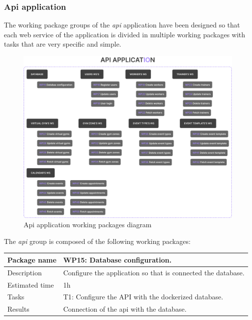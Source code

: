 \documentclass[a4paper, 12pt, oneside]{book}
\begin{document}
\subsubsection{Api application}
\label{working-packages-api}
The working package groups of the \emph{api} application have been designed so that each web service of the application is divided in multiple working packages with tasks that are very specific and simple.
\begin{figure}[H]
	\centering
	\includegraphics[width=\textwidth]{assets/working-packages/Api.png}
	\caption{Api application working packages diagram}
\end{figure}
The \emph{api} group is composed of the following working packages:
\\[8pt]
\begin{tabularx}{\textwidth}{| l | X |}
	\hline
	\rowcolor{rowColor}
	{\semibf Package name}   & {\semibf WP15}: Database configuration.                       \\
	\hline
	{\semibf Description}    & Configure the application so that is connected the database.  \\
	\hline
	\rowcolor{rowColor}
	{\semibf Estimated time} & 1h                                                            \\
	\hline
	{\semibf Tasks}          & {\semibf T1}: Configure the API with the dockerized database. \\
	\hline
	\rowcolor{rowColor}
	{\semibf Results}        & Connection of the api with the database.                      \\
	\hline
\end{tabularx}
\end{document}
